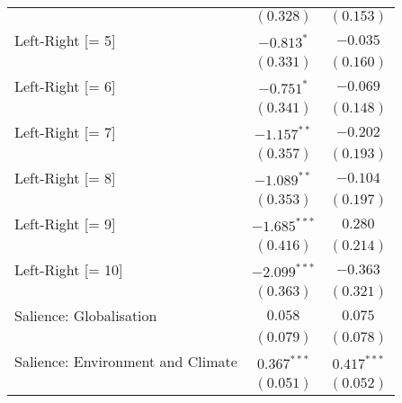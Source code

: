 \begin{center}
\begin{tiny}
\begin{longtable}{l@{} c@{} c@{}}
                                                                           & $(0.328)$        & $(0.153)$        \\
\quad Left-Right [= 5]                                                     & $-0.813^{*}$     & $-0.035$         \\
                                                                           & $(0.331)$        & $(0.160)$        \\
\quad Left-Right [= 6]                                                     & $-0.751^{*}$     & $-0.069$         \\
                                                                           & $(0.341)$        & $(0.148)$        \\
\quad Left-Right [= 7]                                                     & $-1.157^{**}$    & $-0.202$         \\
                                                                           & $(0.357)$        & $(0.193)$        \\
\quad Left-Right [= 8]                                                     & $-1.089^{**}$    & $-0.104$         \\
                                                                           & $(0.353)$        & $(0.197)$        \\
\quad Left-Right [= 9]                                                     & $-1.685^{***}$   & $0.280$          \\
                                                                           & $(0.416)$        & $(0.214)$        \\
\quad Left-Right [= 10]                                                    & $-2.099^{***}$   & $-0.363$         \\
                                                                           & $(0.363)$        & $(0.321)$        \\
\quad Salience: Globalisation                                              & $0.058$          & $0.075$          \\
                                                                           & $(0.079)$        & $(0.078)$        \\
\quad Salience: Environment and Climate                                    & $0.367^{***}$    & $0.417^{***}$    \\
                                                                           & $(0.051)$        & $(0.052)$        \\

\end{longtable}
\end{tiny}
\end{center}
